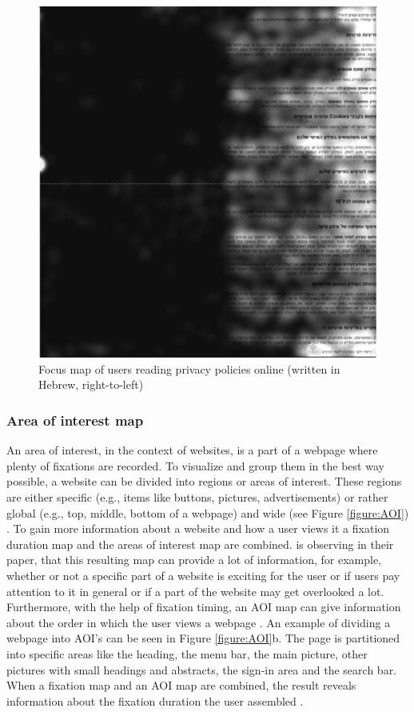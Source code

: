 \begin{figure}[!ht]
    \centering
    \includegraphics[width=0.75\linewidth]{images/focusMap_steinfeld2016agree.png}
    \caption{
       Focus map of users reading privacy policies online (written in Hebrew, right-to-left) \autocite[997]{steinfeld2016agree}
    }
    \label{figure:FocusMap}
\end{figure}

\subsubsection{Area of interest map}
An area of interest, in the context of websites, is a part of a webpage where plenty of fixations are recorded. To visualize and group them in the best way possible, a website can be divided into regions or areas of interest. These regions are either specific (e.g., items like buttons, pictures, advertisements) or rather global (e.g., top, middle, bottom of a webpage) and wide (see Figure \ref{figure:AOI}) \autocite[]{gonzalez2011different, djamasbi2014eye}. To gain more information about a website and how a user views it a fixation duration map and the areas of interest map are combined.
\textcite{djamasbi2014eye} is observing in their paper, that this resulting map can provide a lot of information, for example, whether or not a specific part of a website is exciting for the user or if users pay attention to it in general or if a part of the website may get overlooked a lot. Furthermore, with the help of fixation timing, an AOI map can give information about the order in which the user views a webpage \autocite[]{djamasbi2014eye}.
An example of dividing a webpage into AOI's can be seen in Figure \ref{figure:AOI}b. The page is partitioned into specific areas like the heading, the menu bar, the main picture, other pictures with small headings and abstracts, the sign-in area and the search bar. When a fixation map and an AOI map are combined, the result reveals information about the fixation duration the user assembled \autocite{djamasbi2014eye}.

